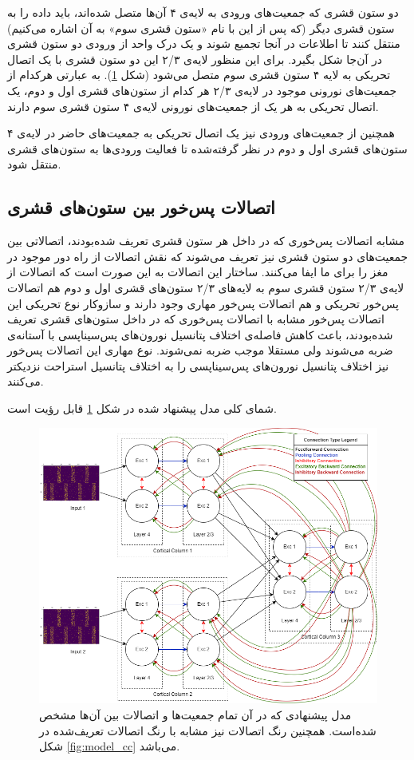 \documentclass[12pt]{report}
\begin{document}
	دو ستون قشری‌ که جمعیت‌های ورودی به لایه‌ی ۴ آن‌ها متصل شده‌اند، باید داده را به ستون قشری دیگر (که پس از این با نام «ستون قشری سوم» به آن اشاره می‌کنیم) منتقل کنند تا اطلاعات در آنجا تجمیع شوند و یک درک واحد از ورودی دو ستون قشری در آن‌جا شکل بگیرد. برای این منظور لایه‌ی ۲/۳ این دو ستون قشری با یک اتصال تحریکی به لایه ۴ ستون قشری سوم متصل می‌شود (شکل \ref{fig:model_overall}). به عبارتی هرکدام از جمعیت‌های نورونی موجود در لایه‌ی ۲/۳ هر کدام از ستون‌های قشری اول و دوم، یک اتصال تحریکی به هر‌ یک از جمعیت‌های نورونی لایه‌ی ۴ ستون قشری سوم دارند. 
	
	همچنین از جمعیت‌های ورودی نیز یک اتصال تحریکی به جمعیت‌های حاضر در لایه‌ی ۴ ستون‌های قشری اول و دوم در نظر گرفته‌شده تا فعالیت ورودی‌ها به ستون‌های قشری منتقل شود.
	
	\subsection{اتصالات پس‌خور بین ستون‌های قشری}
	
	مشابه اتصالات پس‌خوری که در داخل هر ستون قشری تعریف شده‌بودند، اتصالاتی بین جمعیت‌های دو ستون قشری نیز تعریف می‌شوند که نقش اتصالات از راه دور موجود در مغز را برای ما ایفا می‌کنند. ساختار این اتصالات به این صورت است که اتصالات از لایه‌ی ۲/۳ ستون قشری سوم به لایه‌های ۲/۳ ستون‌های قشری اول و دوم هم اتصالات پس‌خور تحریکی و هم اتصالات پس‌خور مهاری وجود دارند و سازوکار نوع تحریکی این اتصالات پس‌خور مشابه با اتصالات پس‌خوری که در داخل ستون‌های قشری تعریف شده‌بودند، باعث کاهش فاصله‌ی اختلاف پتانسیل نورون‌های پس‌سیناپسی با آستانه‌ی ضربه می‌شوند ولی مستقلا موجب ضربه نمی‌شوند. نوع مهاری این اتصالات پس‌خور نیز اختلاف پتانسیل نورون‌های پس‌سیناپسی را به اختلاف پتانسیل استراحت نزدیکتر می‌کنند. 
	
	شمای کلی مدل پیشنهاد شده در شکل \ref{fig:model_overall} قابل رؤیت است.
	
	\begin{figure}[]
		\centering
		\includegraphics[width=1.0\linewidth]{model_overall.png}
		\caption[NS]{
			مدل پیشنهادی که در آن تمام جمعیت‌ها و اتصالات بین آن‌ها مشخص شده‌است. همچنین رنگ اتصالات نیز مشابه با رنگ اتصالات تعریف‌شده در شکل \ref{fig:model_cc} می‌باشد.
		}
		\label{fig:model_overall} 
	\end{figure}
\end{document}
